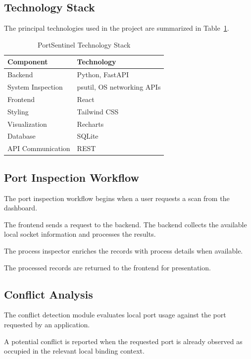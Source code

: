 \documentclass[conference]{IEEEtran}
\begin{document}
\subsection{Technology Stack}

The principal technologies used in the project are
summarized in Table~\ref{tab:stack}.

\begin{table}[!t]
\centering
\caption{PortSentinel Technology Stack}
\label{tab:stack}

\begin{tabular}{|p{}|p{}|}
\hline
\textbf{Component} & \textbf{Technology}\\
\hline
Backend & Python, FastAPI\\
\hline
System Inspection & psutil, OS networking APIs\\
\hline
Frontend & React\\
\hline
Styling & Tailwind CSS\\
\hline
Visualization & Recharts\\
\hline
Database & SQLite\\
\hline
API Communication & REST\\
\hline
\end{tabular}
\end{table}

\subsection{Port Inspection Workflow}

The port inspection workflow begins when a user
requests a scan from the dashboard.

The frontend sends a request to the backend.
The backend collects the available local socket
information and processes the results.

The process inspector enriches the records with
process details when available.

The processed records are returned to the frontend
for presentation.

\subsection{Conflict Analysis}

The conflict detection module evaluates local port
usage against the port requested by an application.

A potential conflict is reported when the requested
port is already observed as occupied in the relevant
local binding context.
\end{document}
